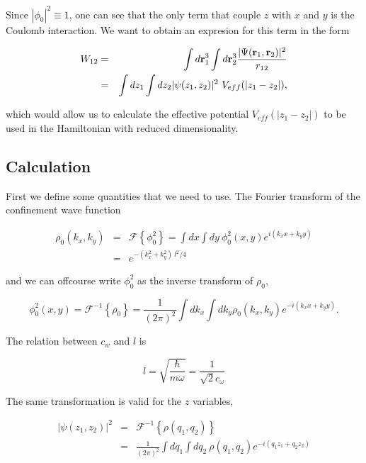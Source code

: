 \documentclass[a4paper,10pt]{article}
\begin{document}
Since $|\phi_0|^2\equiv 1$, one can see that the only term that couple $z$ with $x$ and
$y$ is the Coulomb interaction. We want to obtain an expresion for this term in the form

\begin{eqnarray}\label{coulint}
W_{12}&=&\int d\mathbf{r}^3_1 \int d\mathbf{r}^3_2\frac{|\Psi(\mathbf{r}_1,\mathbf{r}_2)|^2}{r_{12}} \\
&=& \int dz_1\int dz_2 |\psi(z_1,z_2)|^2\ V_{eff}(|z_1-z_2|),
\end{eqnarray}

\noindent which would allow us to calculate the effective potential $V_{eff}(|z_1-z_2|)$
to be used in the Hamiltonian with reduced dimensionality.

\subsection*{Calculation}

First we define some quantities that we need to use. The Fourier transform of the
confinement wave function

\begin{eqnarray}
\rho_0(k_x,k_y)&=&\mathcal{F}\left\lbrace\phi^2_0\right\rbrace = \int
dx\int
dy\ \phi^2_0(x,y)e^{i(k_x x + k_y y)} \\
&=& e^{-(k_x^2+k_y^2)\ l^2/4}
\end{eqnarray}

\noindent and we can offcourse write $\phi^2_0$ as the inverse transform of $\rho_0$,

\begin{equation}
\phi_0^2(x,y) = \mathcal{F}^{-1}\left\lbrace\rho_0\right\rbrace =\frac{1}{(2\pi)^2} \int dk_x \int dk_y \rho_0(k_x,k_y) e^{-i(k_x x + k_y y )}.
\end{equation}

The relation between $c_w$ and $l$ is

\begin{equation}
l=\sqrt{\frac{\hbar}{m \omega}}=\frac{1}{\sqrt{2}c_\omega}
\end{equation}

The same transformation is valid for the $z$ variables,

\begin{eqnarray}
|\psi(z_1,z_2)|^2 &=& \mathcal{F}^{-1}\left\lbrace\rho(q_1,q_2)\right\rbrace \\
&=& \frac{1}{(2\pi)^2} \int dq_1 \int dq_2\ \rho(q_1,q_2) e^{-i(q_1 z_1 + q_2 z_2 )} \\
\end{eqnarray}
\end{document}
